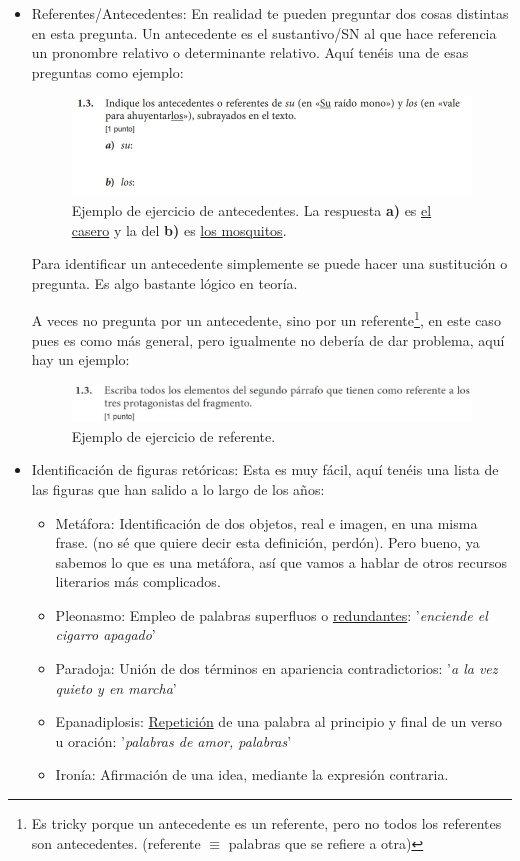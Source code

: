\documentclass[arial,a4paper,print]{article}
\begin{document}
\begin{itemize}
\item Referentes/Antecedentes: En realidad te pueden preguntar dos cosas distintas en esta pregunta.  Un antecedente es el sustantivo/SN al que hace referencia un pronombre relativo o determinante relativo. Aquí tenéis una de esas preguntas como ejemplo:
\begin{figure}[H]
	\centering
	\includegraphics[width=0.8\linewidth]{figures/antecedente}
	\caption{Ejemplo de ejercicio de antecedentes. La respuesta \textbf{a)} es \underline{el casero} y la del \textbf{b)} es \underline{los mosquitos}.}
	\label{fig:antecedente}
\end{figure}

Para identificar un antecedente simplemente se puede hacer una sustitución o pregunta. Es algo bastante lógico en teoría. 

A veces no pregunta por un antecedente, sino por un referente\footnote{Es tricky porque un antecedente es un referente, pero no todos los referentes son antecedentes. (referente $\equiv$ palabras que se refiere a otra)}, en este caso pues es como más general, pero igualmente no debería de dar problema, aquí hay un ejemplo:
\begin{figure}[H]
	\centering
	\includegraphics[width=0.8\linewidth]{figures/referente}
	\caption{Ejemplo de ejercicio de referente.}
	\label{fig:referente}
\end{figure}

\item Identificación de figuras retóricas: Esta es muy fácil, aquí tenéis una lista de las figuras que han salido a lo largo de los años: 
\begin{itemize}
	\item Metáfora: Identificación de dos objetos, real e imagen, en una misma frase. (no sé que quiere decir esta definición, perdón). Pero bueno, ya sabemos lo que es una metáfora, así que vamos a hablar de otros recursos literarios más complicados.
	\item Pleonasmo: Empleo de palabras superfluos o \underline{redundantes}: '\textit{enciende el cigarro apagado}'
	\item Paradoja:  Unión de dos términos en apariencia contradictorios: '\textit{a la vez quieto y en marcha}'
	\item Epanadiplosis: \underline{Repetición} de una palabra al principio y final de un verso u oración: '\textit{palabras de amor, palabras}' 
	\item Ironía: Afirmación de una idea, mediante la expresión contraria. 
\end{itemize}


\end{itemize}
\end{document}
